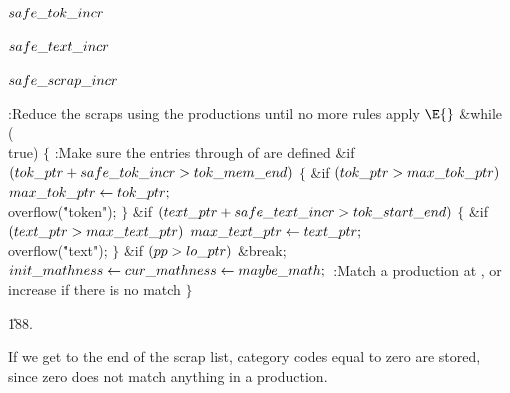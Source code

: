 \Y\B\4\D$\\{safe\_tok\_incr}$ \5
\par
\B\4\D$\\{safe\_text\_incr}$ \5
\par
\B\4\D$\\{safe\_scrap\_incr}$ \5
\par
\Y\B\4:Reduce the scraps using the productions until no more rules apply%
\X${}\E{}$\6
\&{while} (\\{true})\5
${}\{{}$\1\6
:Make sure the entries  through  of  are defined\X\6
\&{if} ${}(\\{tok\_ptr}+\\{safe\_tok\_incr}>\\{tok\_mem\_end}){}$\5
${}\{{}$\1\6
\&{if} ${}(\\{tok\_ptr}>\\{max\_tok\_ptr}){}$\1\5
${}\\{max\_tok\_ptr}\leftarrow\\{tok\_ptr};{}$\2\6
\\{overflow}(\.{"token"});\6
\4${}\}{}$\2\6
\&{if} ${}(\\{text\_ptr}+\\{safe\_text\_incr}>\\{tok\_start\_end}){}$\5
${}\{{}$\1\6
\&{if} ${}(\\{text\_ptr}>\\{max\_text\_ptr}){}$\1\5
${}\\{max\_text\_ptr}\leftarrow\\{text\_ptr};{}$\2\6
\\{overflow}(\.{"text"});\6
\4${}\}{}$\2\6
\&{if} ${}(\\{pp}>\\{lo\_ptr}){}$\1\5
\&{break};\2\6
${}\\{init\_mathness}\leftarrow\\{cur\_mathness}\leftarrow\\{maybe\_math};{}$\6
:Match a production at , or increase  if there is no
match\X\6
\4${}\}{}$\2\par
\U188.\fi

If we get to the end of the scrap list, category codes equal to zero are
stored, since zero does not match anything in a production.

